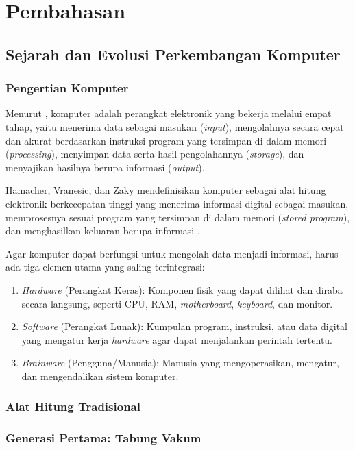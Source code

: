 \section{Pembahasan}
\subsection{Sejarah dan Evolusi Perkembangan Komputer}
\subsubsection{Pengertian Komputer}
Menurut \textcite{AYUBWIMATRA2018}, komputer adalah perangkat elektronik yang bekerja melalui empat tahap, yaitu menerima data sebagai masukan (\textit{input}), mengolahnya secara cepat dan akurat berdasarkan instruksi program yang tersimpan di dalam memori (\textit{processing}), menyimpan data serta hasil pengolahannya (\textit{storage}), dan menyajikan hasilnya berupa informasi (\textit{output}).

Hamacher, Vranesic, dan Zaky mendefinisikan komputer sebagai alat hitung elektronik berkecepatan tinggi yang menerima informasi digital sebagai masukan, memprosesnya sesuai program yang tersimpan di dalam memori (\textit{stored program}), dan menghasilkan keluaran berupa informasi \parencite[dikutip dalam][]{Yahfizham2019}.

Agar komputer dapat berfungsi untuk mengolah data menjadi informasi, harus ada tiga elemen utama yang saling terintegrasi:

\begin{enumerate}
    \item \textit{Hardware} (Perangkat Keras): Komponen fisik yang dapat dilihat dan diraba secara langsung, seperti CPU, RAM, \textit{motherboard}, \textit{keyboard}, dan monitor.
    \item \textit{Software} (Perangkat Lunak): Kumpulan program, instruksi, atau data digital yang mengatur kerja \textit{hardware} agar dapat menjalankan perintah tertentu.
    \item \textit{Brainware} (Pengguna/Manusia): Manusia yang mengoperasikan, mengatur, dan mengendalikan sistem komputer.
\end{enumerate}

\subsubsection{Alat Hitung Tradisional}

\subsubsection{Generasi Pertama: Tabung Vakum}


